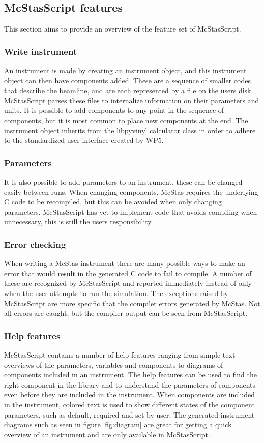 \documentclass[11pt, a4paper]{article}
\begin{document}
\subsection{McStasScript features}
This section aims to provide an overview of the feature set of McStasScript.

\subsubsection{Write instrument}
An instrument is made by creating an instrument object, and this instrument object can then have components added. These are a sequence of smaller codes that describe the beamline, and are each represented by a file on the users disk. McStasScript parses these files to internalize information on their parameters and units. It is possible to add components to any point in the sequence of components, but it is most common to place new components at the end. The instrument object inherits from the libpyvinyl calculator class in order to adhere to the standardized user interface created by WP5.

\subsubsection{Parameters}
It is also possible to add parameters to an instrument, these can be changed easily between runs. When changing components, McStas requires the underlying C code to be recompiled, but this can be avoided when only changing parameters. McStasScript has yet to implement code that avoids compiling when unnecessary, this is still the users responsibility.

\subsubsection{Error checking}
When writing a McStas instrument there are many possible ways to make an error that would result in the generated C code to fail to compile. A number of these are recognized by McStasScript and reported immediately instead of only when the user attempts to run the simulation. The exceptions raised by McStasScript are more specific that the compiler errors generated by McStas. Not all errors are caught, but the compiler output can be seen from McStasScript.

\subsubsection{Help features}
McStasScript contains a number of help features ranging from simple text overviews of the parameters, variables and components to diagrams of components included in an instrument. The help features can be used to find the right component in the library and to understand the parameters of components even before they are included in the instrument. When components are included in the instrument, colored text is used to show different states of the component parameters, such as default, required and set by user. The generated instrument diagrams such as seen in figure \ref{fig:diagram} are great for getting a quick overview of an instrument and are only available in McStasScript.
\end{document}
